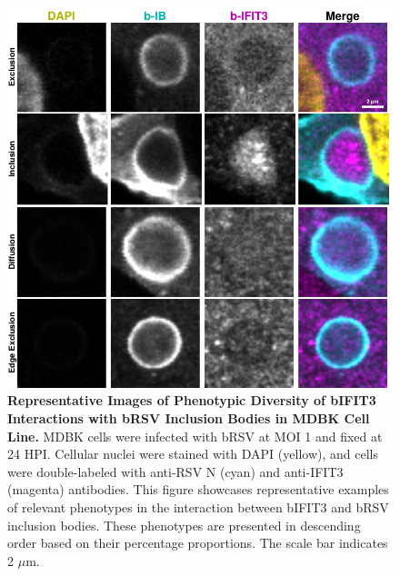 \begin{figure}
    \centering
    \includegraphics[width=1\linewidth]{08. Chapter 3/Figs/02. Infection/03. IFIT3/09. mdbk i3.pdf}
    \caption[Representative Images of Phenotypic Diversity of bIFIT3 Interactions with bRSV Inclusion Bodies in MDBK Cell Line.]{\textbf{Representative Images of Phenotypic Diversity of bIFIT3 Interactions with bRSV Inclusion Bodies in MDBK Cell Line.} MDBK cells were infected with bRSV at MOI 1 and fixed at 24 HPI. Cellular nuclei were stained with DAPI (yellow), and cells were double-labeled with anti-RSV N (cyan) and anti-IFIT3 (magenta) antibodies. This figure showcases representative examples of relevant phenotypes in the interaction between bIFIT3 and bRSV inclusion bodies. These phenotypes are presented in descending order based on their percentage proportions. The scale bar indicates 2 \(\mu \mbox{m}\).}
    \label{fig:Representative Images of Phenotypic Diversity of bIFIT3 Interactions with bRSV Inclusion Bodies in MDBK Cell Line}
\end{figure}

